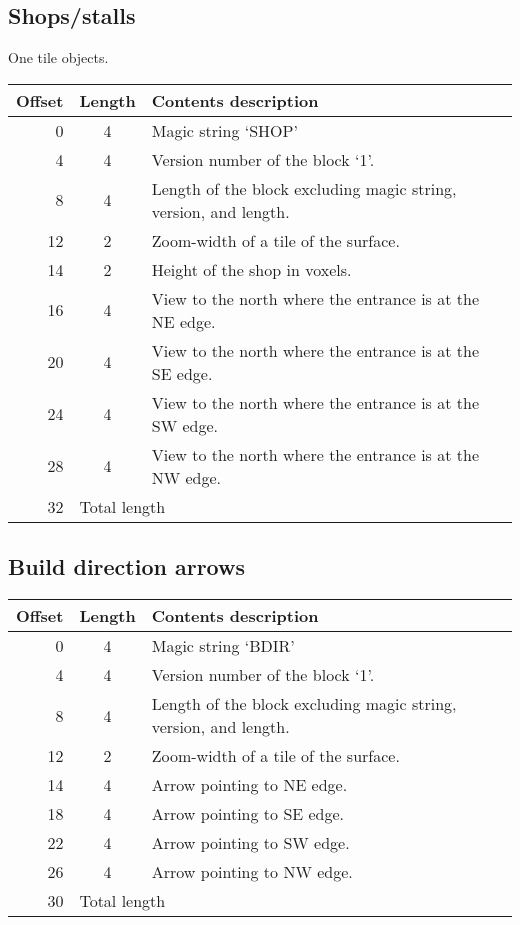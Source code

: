 \documentclass{article}
\begin{document}
\subsection{Shops/stalls}
One tile objects.

\begin{center}
\begin{tabular}{|r|c|l|} \hline
\textbf{Offset} & \textbf{Length} & \textbf{Contents description} \\ \hline
   0 &  4 & Magic string `SHOP' \\
   4 &  4 & Version number of the block `1'. \\
   8 &  4 & Length of the block excluding magic string, version, and length. \\
  12 &  2 & Zoom-width of a tile of the surface. \\
  14 &  2 & Height of the shop in voxels. \\
  16 &  4 & View to the north where the entrance is at the NE edge. \\
  20 &  4 & View to the north where the entrance is at the SE edge. \\
  24 &  4 & View to the north where the entrance is at the SW edge. \\
  28 &  4 & View to the north where the entrance is at the NW edge. \\ \hline
  32 & \multicolumn{2}{l|}{Total length} \\ \hline
\end{tabular}
\end{center}


\subsection{Build direction arrows}
\begin{center}
\begin{tabular}{|r|c|l|} \hline
\textbf{Offset} & \textbf{Length} & \textbf{Contents description} \\ \hline
   0 &  4 & Magic string `BDIR' \\
   4 &  4 & Version number of the block `1'. \\
   8 &  4 & Length of the block excluding magic string, version, and length. \\
  12 &  2 & Zoom-width of a tile of the surface. \\
  14 &  4 & Arrow pointing to NE edge. \\
  18 &  4 & Arrow pointing to SE edge. \\
  22 &  4 & Arrow pointing to SW edge. \\
  26 &  4 & Arrow pointing to NW edge. \\ \hline
  30 & \multicolumn{2}{l|}{Total length} \\ \hline
\end{tabular}
\end{center}
\end{document}
